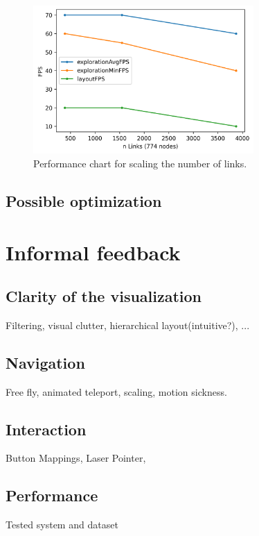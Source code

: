 \begin{figure}[h]
    \centering
    \includegraphics[width=0.75\textwidth]{graphics/performanceAnalysisLinks.png}
    \caption{Performance chart for scaling the number of links.} 
    \label{fig:performanceLinks} 
\end{figure}

\subsection{Possible optimization}


\section{Informal feedback}

\subsection{Clarity of the visualization}
Filtering, visual clutter, hierarchical layout(intuitive?), ...

\subsection{Navigation}
Free fly, animated teleport, scaling, motion sickness.

\subsection{Interaction}
Button Mappings, Laser Pointer, 

\subsection{Performance}
Tested system and dataset